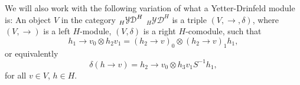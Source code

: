 

We will also work with the following variation of what a Yetter-Drinfeld module
is: An object $V$ in the category 
$\prescript{}{H}{\mathcal{YD}^H}$
$_{H}\mathcal{YD}^{H}$ 
is a triple
$(V,\rightarrow,\delta)$, where $(V,\rightarrow)$ is a left $H$-module,
$(V,\delta)$ is a right $H$-comodule, such that
\[
h_{1}\rightarrow v_{0}\otimes h_{2}v_{1}=(h_{2}\rightarrow v)_{0}\otimes(h_{2}\rightarrow v)_{1}h_{1},
\]
or equivalently
\[
\delta(h\rightarrow v)=h_{2}\rightarrow v_{0}\otimes h_{3}v_{1}S^{-1}h_{1},
\]
for all $v\in V$, $h\in H$. 

%

